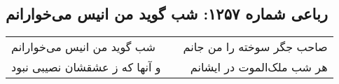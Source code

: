 \begin{center}
\section*{رباعی شماره ۱۲۵۷: شب گوید من انیس می‌خوارانم}
\label{sec:1257}
\begin{longtable}{l p{0.5cm} r}
شب گوید من انیس می‌خوارانم
&&
صاحب جگر سوخته را من جانم
\\
و آنها که ز عشقشان نصیبی نبود
&&
هر شب ملک‌الموت در ایشانم
\\
\end{longtable}
\end{center}
